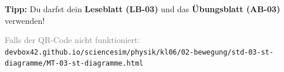 \documentclass[11pt, a4paper]{article}
\begin{document}
\vspace{1.5em}


\begin{tcolorbox}[
    colback=white,
    colframe=physik,
    boxrule=1pt,
    arc=0pt
]
\textbf{Tipp:} Du darfst dein \textbf{Leseblatt (LB-03)} und das \textbf{Übungsblatt (AB-03)} verwenden!
\end{tcolorbox}

\vfill


\begin{center}
\textcolor{gray}{\small Falls der QR-Code nicht funktioniert:}\\[0.3em]
\texttt{\small devbox42.github.io/sciencesim/physik/kl06/02-bewegung/std-03-st-diagramme/MT-03-st-diagramme.html}
\end{center}
\end{document}
